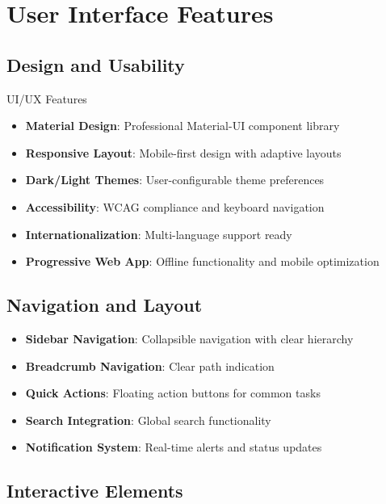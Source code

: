 \documentclass[11pt,a4paper]{article}
\begin{document}
\section{User Interface Features}

\subsection{Design and Usability}

\begin{featurebox}{\faPalette\space UI/UX Features}
\begin{itemize}
    \item \textbf{Material Design}: Professional Material-UI component library
    \item \textbf{Responsive Layout}: Mobile-first design with adaptive layouts
    \item \textbf{Dark/Light Themes}: User-configurable theme preferences
    \item \textbf{Accessibility}: WCAG compliance and keyboard navigation
    \item \textbf{Internationalization}: Multi-language support ready
    \item \textbf{Progressive Web App}: Offline functionality and mobile optimization
\end{itemize}
\end{featurebox}

\subsection{Navigation and Layout}

\begin{itemize}
    \item \textbf{Sidebar Navigation}: Collapsible navigation with clear hierarchy
    \item \textbf{Breadcrumb Navigation}: Clear path indication
    \item \textbf{Quick Actions}: Floating action buttons for common tasks
    \item \textbf{Search Integration}: Global search functionality
    \item \textbf{Notification System}: Real-time alerts and status updates
\end{itemize}

\subsection{Interactive Elements}
\end{document}
